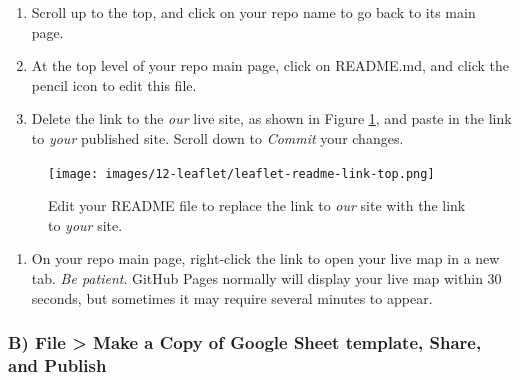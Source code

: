\documentclass[
  english,
]{book}
\providecommand{\tightlist}{%
  \setlength{\itemsep}{0pt}\setlength{\parskip}{0pt}}
\begin{document}
\begin{enumerate}
\def\labelenumi{\arabic{enumi}.}
\setcounter{enumi}{5}
\item
  Scroll up to the top, and click on your repo name to go back to its main page.
\item
  At the top level of your repo main page, click on README.md, and click the pencil icon to edit this file.
\item
  Delete the link to the \emph{our} live site, as shown in Figure \ref{fig:leaflet-readme-link-top}, and paste in the link to \emph{your} published site. Scroll down to \emph{Commit} your changes.
\end{enumerate}



\begin{figure}
\centering
\texttt{[image: images/12-leaflet/leaflet-readme-link-top.png]}
\caption{\label{fig:leaflet-readme-link-top}Edit your README file to replace the link to \emph{our} site with the link to \emph{your} site.}
\end{figure}

\begin{enumerate}
\def\labelenumi{\arabic{enumi}.}
\setcounter{enumi}{8}
\tightlist
\item
  On your repo main page, right-click the link to open your live map in a new tab. \emph{Be patient}. GitHub Pages normally will display your live map within 30 seconds, but sometimes it may require several minutes to appear.
\end{enumerate}

\hypertarget{b-file-make-a-copy-of-google-sheet-template-share-and-publish}{%
\subsubsection*{B) File \textgreater{} Make a Copy of Google Sheet template, Share, and Publish}\label{b-file-make-a-copy-of-google-sheet-template-share-and-publish}}
\end{document}
